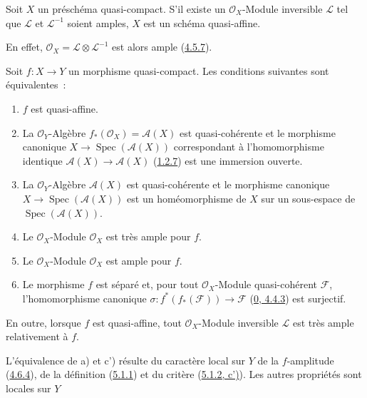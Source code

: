 \begin{corollary}[5.1.5]
\label{II.5.1.5-fr}
Soit $X$ un préschéma quasi-compact. S'il existe un $\mathcal{O}_X$-Module
inversible $\mathcal{L}$ tel que $\mathcal{L}$ et $\mathcal{L}^{-1}$ soient
amples, $X$ est un schéma quasi-affine.
\end{corollary}

En effet, $\mathcal{O}_X=\mathcal{L}\otimes\mathcal{L}^{-1}$ est alors ample
(\hyperref[II.4.5.7-fr]{4.5.7}).

\begin{proposition}[5.1.6]
\label{II.5.1.6-fr}
Soit $f:X\to Y$ un morphisme quasi-compact. Les conditions suivantes sont
équivalentes~:
\begin{enumerate}
  \item[\rm{a)}] $f$ est quasi-affine.
  \item[\rm{b)}] La $\mathcal{O}_Y$-Algèbre
  $f_*(\mathcal{O}_X)=\mathcal{A}(X)$ est quasi-cohérente et le morphisme
  canonique $X\to\operatorname{Spec}(\mathcal{A}(X))$ correspondant à
  l'homomorphisme identique $\mathcal{A}(X)\to\mathcal{A}(X)$
  (\hyperref[II.1.2.7-fr]{1.2.7}) est une immersion ouverte.
  \item[\rm{b')}] La $\mathcal{O}_Y$-Algèbre $\mathcal{A}(X)$ est
  quasi-cohérente et le morphisme canonique
  $X\to\operatorname{Spec}(\mathcal{A}(X))$ est un homéomorphisme de $X$
  sur un sous-espace de $\operatorname{Spec}(\mathcal{A}(X))$.
  \item[\rm{c)}] Le $\mathcal{O}_X$-Module $\mathcal{O}_X$ est très ample
  pour $f$.
  \item[\rm{c')}] Le $\mathcal{O}_X$-Module $\mathcal{O}_X$ est ample pour
  $f$.
  \item[\rm{d)}] Le morphisme $f$ est séparé et, pour tout
  $\mathcal{O}_X$-Module quasi-cohérent $\mathcal{F}$, l'homomorphisme
  canonique $\sigma:f^*(f_*(\mathcal{F}))\to\mathcal{F}$
  (\hyperref[0.4.4.3-fr]{0, 4.4.3}) est surjectif.
\end{enumerate}
En outre, lorsque $f$ est quasi-affine, tout $\mathcal{O}_X$-Module
inversible $\mathcal{L}$ est très ample relativement à $f$.
\end{proposition}

L'équivalence de a) et c') résulte du caractère local sur $Y$ de la
$f$-amplitude (\hyperref[II.4.6.4-fr]{4.6.4}), de la définition
(\hyperref[II.5.1.1-fr]{5.1.1}) et du critère
(\hyperref[II.5.1.2-fr]{5.1.2, c')}). Les autres propriétés sont locales sur
$Y$

